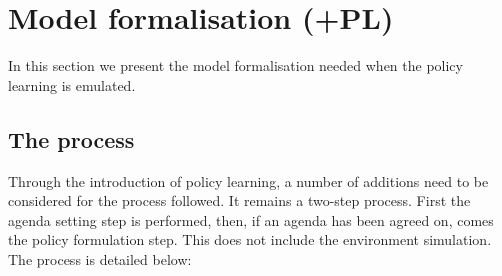 \documentclass[11pt]{article}
\begin{document}


\section{Model formalisation (+PL)}

In this section we present the model formalisation needed when the policy learning is emulated.

\subsection{The process}

Through the introduction of policy learning, a number of additions need to be considered for the process followed. It remains a two-step process. First the agenda setting step is performed, then, if an agenda has been agreed on, comes the policy formulation step. This does not include the environment simulation. The process is detailed below:
\end{document}
